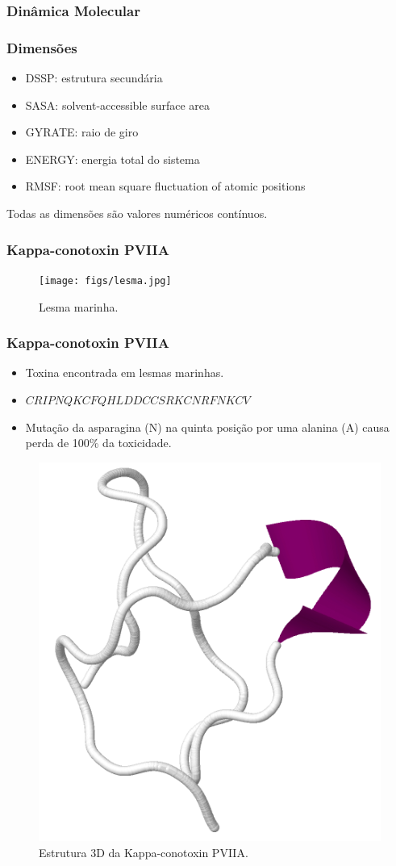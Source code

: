 \documentclass{beamer}
\begin{document}
\begin{frame}
\frametitle{Dinâmica Molecular}
\begin{figure}
    \centering
\end{figure}
\end{frame}

\begin{frame}
\frametitle{Dimensões}
\begin{itemize}
\item DSSP: estrutura secundária
\item SASA: solvent-accessible surface area
\item GYRATE: raio de giro
\item ENERGY: energia total do sistema
\item RMSF: root mean square fluctuation of atomic positions
\end{itemize}
Todas as dimensões são valores numéricos contínuos.
\end{frame}

\begin{frame}
\frametitle{Kappa-conotoxin PVIIA}
\begin{figure}
\texttt{[image: figs/lesma.jpg]}
\caption{Lesma marinha.} 
\label{fig:lesma}
\end{figure}
\end{frame}

\begin{frame}
\frametitle{Kappa-conotoxin PVIIA}
\begin{itemize}
 \item Toxina encontrada em lesmas marinhas.
 \item $CRIPNQKCFQHLDDCCSRKCNRFNKCV$
 \item Mutação da asparagina (N) na quinta posição por uma alanina (A) causa perda de 100\% da toxicidade.
\end{itemize}
\begin{figure}
\includegraphics[width=0.3\linewidth]{figs/pviia.png}
\caption{Estrutura 3D da Kappa-conotoxin PVIIA.} 
\label{fig:pviia}
\end{figure}
\end{frame}
\end{document}
